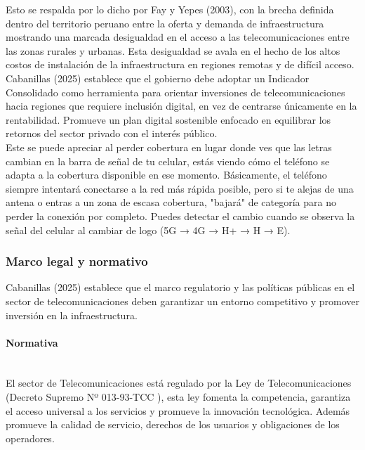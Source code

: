 \documentclass[12pt,a4paper]{article}
\begin{document}
	Esto se respalda por lo dicho por Fay y Yepes (2003), con la brecha definida dentro del territorio peruano entre la oferta y demanda de infraestructura mostrando una marcada desigualdad en el acceso a las telecomunicaciones entre las zonas rurales y urbanas. Esta desigualdad se avala en el hecho de los altos costos de instalación de la infraestructura en regiones remotas y de difícil acceso.\\
	
	Cabanillas (2025) establece que el gobierno debe adoptar un Indicador Consolidado como herramienta para orientar inversiones de telecomunicaciones hacia regiones que requiere inclusión digital, en vez de centrarse únicamente en la rentabilidad. Promueve un plan digital sostenible enfocado en equilibrar los retornos del sector privado con el interés público.\\
	
	Este se puede apreciar al perder cobertura en lugar donde ves que las letras cambian en la barra de señal de tu celular, estás viendo cómo el teléfono se adapta a la cobertura disponible en ese momento. Básicamente, el teléfono siempre intentará conectarse a la red más rápida posible, pero si te alejas de una antena o entras a un zona de escasa cobertura, "bajará" de categoría para no perder la conexión por completo. Puedes detectar el cambio cuando se observa la señal del celular al cambiar de logo (5G → 4G → H+ → H → E).

	\subsubsection{Marco legal y normativo}
	
	Cabanillas (2025) establece que el marco regulatorio y las políticas públicas en el sector de telecomunicaciones deben garantizar un entorno competitivo y promover inversión en la infraestructura. 
	
	\paragraph*{Normativa} \mbox{}\\
	
	El sector de Telecomunicaciones está regulado por la Ley de Telecomunicaciones (Decreto Supremo Nº 013-93-TCC ), esta ley fomenta la competencia, garantiza el acceso universal a los servicios y promueve la innovación tecnológica. Además promueve la calidad de servicio, derechos de los usuarios y obligaciones de los operadores.\\
	
\end{document}
